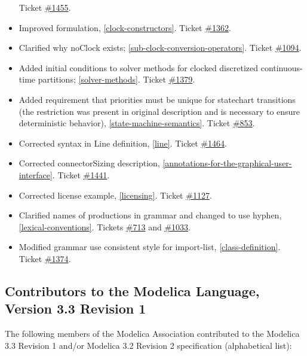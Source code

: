 \begin{itemize}
  Ticket \href{https://trac.modelica.org/Modelica/ticket/1455}{\#1455}.
\item
  Improved formulation, \autoref{clock-constructors}. Ticket
  \href{https://trac.modelica.org/Modelica/ticket/1362}{\#1362}.
\item
  Clarified why noClock exists; \autoref{sub-clock-conversion-operators}. Ticket
  \href{https://trac.modelica.org/Modelica/ticket/1094}{\#1094}.
\item
  Added initial conditions to solver methods for clocked discretized
  continuous-time partitions; \autoref{solver-methods}. Ticket
  \href{https://trac.modelica.org/Modelica/ticket/1379}{\#1379}.
\item
  Added requirement that priorities must be unique for statechart
  transitions (the restriction was present in original description and
  is necessary to ensure deterministic behavior), \autoref{state-machine-semantics}. Ticket
  \href{https://trac.modelica.org/Modelica/ticket/853}{\#853}.
\item
  Corrected syntax in Line definition, \autoref{line}. Ticket
  \href{https://trac.modelica.org/Modelica/ticket/1464}{\#1464}.
\item
  Corrected connectorSizing description, \autoref{annotations-for-the-graphical-user-interface}. Ticket
  \href{https://trac.modelica.org/Modelica/ticket/1441}{\#1441}.
\item
  Corrected license example, \autoref{licensing}. Ticket
  \href{https://trac.modelica.org/Modelica/ticket/1127}{\#1127}.
\item
  Clarified names of productions in grammar and changed to use hyphen,
  \autoref{lexical-conventions}. Tickets
  \href{https://trac.modelica.org/Modelica/ticket/713}{\#713} and
  \href{https://trac.modelica.org/Modelica/ticket/1033}{\#1033}.
\item
  Modified grammar use consistent style for import-list, \autoref{class-definition}.
  Ticket \href{https://trac.modelica.org/Modelica/ticket/1374}{\#1374}.
\end{itemize}

\subsection{Contributors to the Modelica Language, Version 3.3 Revision 1}

The following members of the Modelica Association contributed to the
Modelica 3.3 Revision 1 and/or Modelica 3.2 Revision 2 specification
(alphabetical list):

